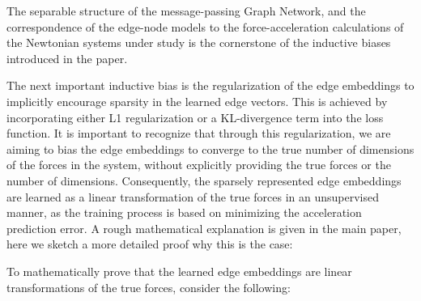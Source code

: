 \documentclass{article}
\begin{document}
The separable structure of the message-passing Graph Network, and the correspondence of the edge-node models to the force-acceleration calculations of the Newtonian systems under study is the cornerstone of the inductive biases introduced in the paper. 

The next important inductive bias is the regularization of the edge embeddings to implicitly encourage sparsity in the learned edge vectors. This is achieved by incorporating either L1 regularization or a KL-divergence term into the loss function. It is important to recognize that through this regularization, we are aiming to bias the edge embeddings to converge to the true number of dimensions of the forces in the system, without explicitly providing the true forces or the number of dimensions. Consequently, the sparsely represented edge embeddings are learned as a linear transformation of the true forces in an unsupervised manner, as the training process is based on minimizing the acceleration prediction error. A rough mathematical explanation is given in the main paper, here we sketch a more detailed proof why this is the case:

To mathematically prove that the learned edge embeddings are linear transformations of the true forces, consider the following:
\end{document}
